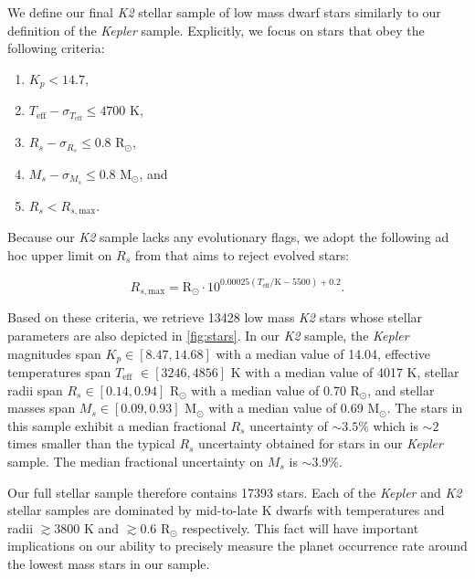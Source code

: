 \documentclass[twocolumn]{emulateapj}
\newcommand{\kepler}[1]{\emph{Kepler}#1}
\newcommand{\ktwo}[1]{\emph{K2}#1}
\newcommand{\teff}[1]{$T_{\text{eff}}$#1}
\begin{document}
We define our final \ktwo{} stellar sample of low mass dwarf stars similarly to our definition of the \kepler{} sample.
Explicitly, we focus on stars that obey the following criteria:

\begin{enumerate}
\item $K_p < 14.7$,
\item $T_{\text{eff}} - \sigma_{T_{\text{eff}}} \leq 4700$ K,
\item $R_s - \sigma_{R_s} \leq 0.8$ R$_{\odot}$,
\item $M_s - \sigma_{M_s} \leq 0.8$ M$_{\odot}$, and
\item $R_s < R_{s,\text{max}}$.
\end{enumerate}

\noindent Because our \ktwo{} sample lacks any evolutionary flags, we adopt the following ad hoc upper limit on $R_s$
from \cite{fulton17} that aims to reject evolved stars:

\begin{equation}
  R_{s,\text{max}} = \text{R}_{\odot} \cdot 10^{0.00025(T_{\text{eff}}/\text{K}-5500)+0.2}.
\end{equation}

\noindent Based on these criteria, we retrieve 13428 low mass \ktwo{} stars whose
stellar parameters are also depicted in \autoref{fig:stars}.
In our \ktwo{} sample, the \kepler{} magnitudes span $K_p \in [8.47, 14.68]$ with a median value of 14.04,
effective temperatures span \teff{} $\in [3246, 4856]$ K with a median value of 4017 K,
stellar radii span $R_s \in [0.14, 0.94]$ R$_{\odot}$ with a median value of 0.70 R$_{\odot}$, and
stellar masses span $M_s \in [0.09, 0.93]$ M$_{\odot}$ with a median value of 0.69 M$_{\odot}$.
The stars in this sample exhibit a median fractional $R_s$ uncertainty of $\sim 3.5$\% which is $\sim 2$
times smaller than the typical $R_s$ uncertainty obtained for stars in our \kepler{} sample.
The median fractional uncertainty on $M_s$ is $\sim 3.9$\%.

Our full stellar sample therefore contains 17393 stars.
Each of the \kepler{} and \ktwo{} stellar samples are dominated by mid-to-late K dwarfs
with temperatures and radii $\gtrsim 3800$ K and $\gtrsim 0.6$ R$_{\odot}$ respectively. This
fact will have important implications on our ability to precisely measure the planet occurrence
rate around the lowest mass stars in our sample.
\end{document}
